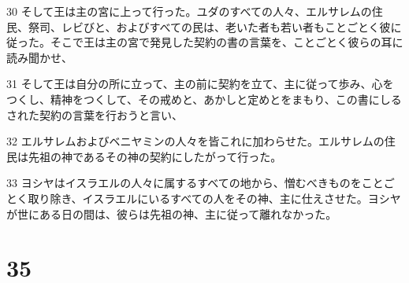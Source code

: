 \par 30 そして王は主の宮に上って行った。ユダのすべての人々、エルサレムの住民、祭司、レビびと、およびすべての民は、老いた者も若い者もことごとく彼に従った。そこで王は主の宮で発見した契約の書の言葉を、ことごとく彼らの耳に読み聞かせ、
\par 31 そして王は自分の所に立って、主の前に契約を立て、主に従って歩み、心をつくし、精神をつくして、その戒めと、あかしと定めとをまもり、この書にしるされた契約の言葉を行おうと言い、
\par 32 エルサレムおよびベニヤミンの人々を皆これに加わらせた。エルサレムの住民は先祖の神であるその神の契約にしたがって行った。
\par 33 ヨシヤはイスラエルの人々に属するすべての地から、憎むべきものをことごとく取り除き、イスラエルにいるすべての人をその神、主に仕えさせた。ヨシヤが世にある日の間は、彼らは先祖の神、主に従って離れなかった。

\chapter{35}


